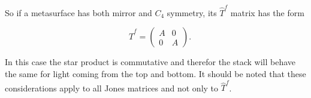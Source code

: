 So if a metasurface has both mirror and $C_4$ symmetry, its $\hat T^f$ matrix has the form

\begin{equation}
    \quad
    \hat T^f =
    \begin{pmatrix}
        A & 0 \\
        0 & A
    \end{pmatrix}.
\end{equation}

In this case the star product is commutative and therefor the stack will behave the same for light coming from the top and bottom.
It should be noted that these considerations apply to all Jones matrices and not only to $\hat T^f$.
